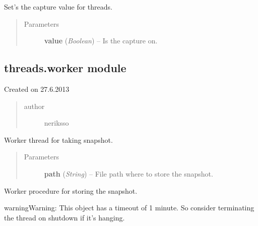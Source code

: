 \documentclass[letterpaper,10pt,english]{sphinxmanual}
\begin{document}

\begin{fulllineitems}
\label{threads:threads.inputcapture.set_capture}
Set's the capture value for threads.
\begin{quote}\begin{description}
\item[{Parameters}] \leavevmode
\textbf{value} (\emph{Boolean}) -- Is the capture on.

\end{description}\end{quote}

\end{fulllineitems}



\subsection{threads.worker module}
\label{threads:threads-worker-module}\label{threads:module-threads.worker}
Created on 27.6.2013
\begin{quote}\begin{description}
\item[{author}] \leavevmode
neriksso

\end{description}\end{quote}

\begin{fulllineitems}
\label{threads:threads.worker.SNAPSHOT_THREAD}
Worker thread for taking snapshot.
\begin{quote}\begin{description}
\item[{Parameters}] \leavevmode
\textbf{path} (\emph{String}) -- File path where to store the snapshot.

\end{description}\end{quote}

\begin{fulllineitems}
\label{threads:threads.worker.SNAPSHOT_THREAD.run}
Worker procedure for storing the snapshot.

\begin{notice}{warning}{Warning:}
This object has a timeout of 1 minute. So consider terminating
the thread on shutdown if it's hanging.
\end{notice}

\end{fulllineitems}


\end{fulllineitems}
\end{document}
